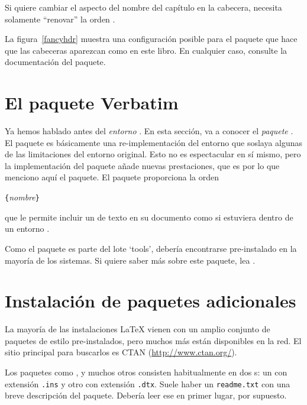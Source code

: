 Si quiere cambiar el aspecto del nombre del capítulo en la cabecera, necesita solamente ``renovar'' la orden . 

La figura~\ref{fancyhdr} muestra una configuración posible para el paquete  que hace que las cabeceras aparezcan como en este libro.  En cualquier caso, consulte la documentación del paquete.

\section{El paquete Verbatim}

Ya hemos hablado antes del \emph{entorno} .  En esta sección, va a conocer el \emph{paquete} .  El paquete  es básicamente una re-implementación del entorno  que soslaya algunas de las limitaciones del entorno  original.  Esto no es espectacular en sí mismo, pero la implementación del paquete  añade nuevas prestaciones, que es por lo que menciono aquí el paquete.  El paquete  proporciona la orden
\begin{lscommand}
\verb|{|\emph{nombre\filenomo{}}\verb|}|
\end{lscommand}

que le permite incluir un \filenomo{} de texto en su documento como si estuviera dentro de un entorno .

Como el paquete   es parte del lote `tools', debería encontrarse pre-instalado en la mayoría de los sistemas.  Si quiere saber más sobre este paquete, lea \cite{verbatim}.


\section{Instalación de paquetes adicionales}\label{sec:Packages}

La mayoría de las instalaciones \LaTeX{} vienen con un amplio conjunto de paquetes de estilo pre-instalados, pero muchos más están disponibles en la red.  El sitio principal para buscarlos es CTAN (\url{http://www.ctan.org/}).

Los paquetes como ,  y muchos otros consisten habitualmente en dos \filenomo{}s: un \filenomo{} con extensión \texttt{.ins} y otro con extensión \texttt{.dtx}.  Suele haber un \filenomo{} \texttt{readme.txt} con una breve descripción del paquete. Debería leer ese \filenomo{} en primer lugar, por supuesto.

